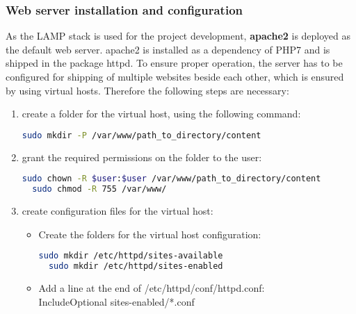\subsubsection{Web server installation and configuration}
As the LAMP stack is used for the project development, \textbf{apache2} is deployed as the default web server. apache2 is installed as a dependency of PHP7 and is shipped in 
the package httpd. To ensure proper operation, the server has to be configured for shipping of multiple websites beside each other, which is ensured by using virtual hosts. 
Therefore the following steps are necessary: 
\begin{enumerate}
 \item create a folder for the virtual host, using the following command:
 \begin{lstlisting}[language=bash]
  sudo mkdir -P /var/www/path_to_directory/content
 \end{lstlisting}
 \item grant the required permissions on the folder to the user:
 \begin{lstlisting}[language=bash]
  sudo chown -R $user:$user /var/www/path_to_directory/content
  sudo chmod -R 755 /var/www/
 \end{lstlisting}
 \item create configuration files for the virtual host:
 \begin{itemize}
  \item Create the folders for the virtual host configuration:
 \begin{lstlisting}[language=bash]
  sudo mkdir /etc/httpd/sites-available
  sudo mkdir /etc/httpd/sites-enabled
 \end{lstlisting}
 \item Add a line at the end of /etc/httpd/conf/httpd.conf:\\
 IncludeOptional sites-enabled/*.conf
 \end{itemize}
\end{enumerate}

